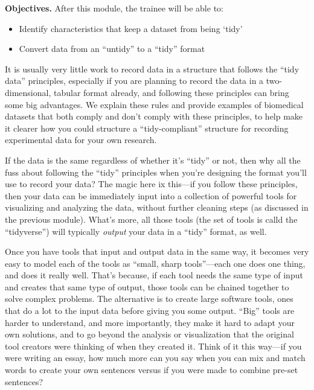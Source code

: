 \documentclass[]{tufte-book}
\providecommand{\tightlist}{%
  \setlength{\itemsep}{0pt}\setlength{\parskip}{0pt}}
\begin{document}
\textbf{Objectives.} After this module, the trainee will be able to:

\begin{itemize}
\tightlist
\item
  Identify characteristics that keep a dataset from being `tidy'
\item
  Convert data from an ``untidy'' to a ``tidy'' format
\end{itemize}

It is usually very little work to record data in a structure
that follows the ``tidy data'' principles, especially if you are planning to record
the data in a two-dimensional, tabular format already, and following these
principles can bring some big advantages. We explain these rules and provide
examples of biomedical datasets that both comply and don't comply with these
principles, to help make it clearer how you could structure a ``tidy-compliant''
structure for recording experimental data for your own research.

If the data is the same regardless of whether it's ``tidy'' or not, then why all
the fuss about following the ``tidy'' principles when you're designing the format
you'll use to record your data? The magic here ix this---if you follow these
principles, then your data can be immediately input into a collection of
powerful tools for visualizing and analyzing the data, without further cleaning
steps (as discussed in the previous module). What's more, all those tools (the
set of tools is calld the ``tidyverse'') will typically \emph{output} your data in a
``tidy'' format, as well.

Once you have tools that input and output data in the same way, it becomes very
easy to model each of the tools as ``small, sharp tools''---each one does one
thing, and does it really well. That's because, if each tool needs the same
type of input and creates that same type of output, those tools can be chained
together to solve complex problems. The alternative is to create large software
tools, ones that do a lot to the input data before giving you some output.
``Big'' tools are harder to understand, and more importantly, they make it hard
to adapt your own solutions, and to go beyond the analysis or visualization that
the original tool creators were thinking of when they created it. Think of it this
way---if you were writing an essay, how much more can you say when you can mix and
match words to create your own sentences versus if you were made to combine
pre-set sentences?
\end{document}
